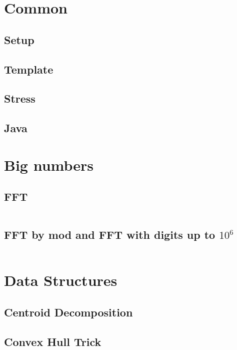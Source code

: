 
\tableofcontents
\clearpage
\twocolumn

\newcommand{\cpi}[1]{\inputminted[mathescape,tabsize=2,breaklines=true]{cpp}{#1}}


\section{Common}

\subsection{Setup}

\subsection{Template}

\subsection{Stress}

\subsection{Java}
 


\section{Big numbers}

\subsection{FFT}
\cpi{../BigNum/FFT.cpp}
\subsection{FFT by mod and FFT with digits up to $10^6$}
\cpi{../BigNum/FFT_mod_ll.cpp}


\section{Data Structures}

\subsection{Centroid Decomposition}

\subsection{Convex Hull Trick}

